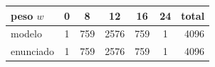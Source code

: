 \begin{tabular}{@{}l*{5}{c}r@{}}
\toprule
peso $w$ & 0 & 8 & 12 & 16 & 24 & total \\
\midrule
modelo & 1 & 759 & 2576 & 759 & 1 & 4096 \\
enunciado & 1 & 759 & 2576 & 759 & 1 & 4096 \\
\bottomrule
\end{tabular}
